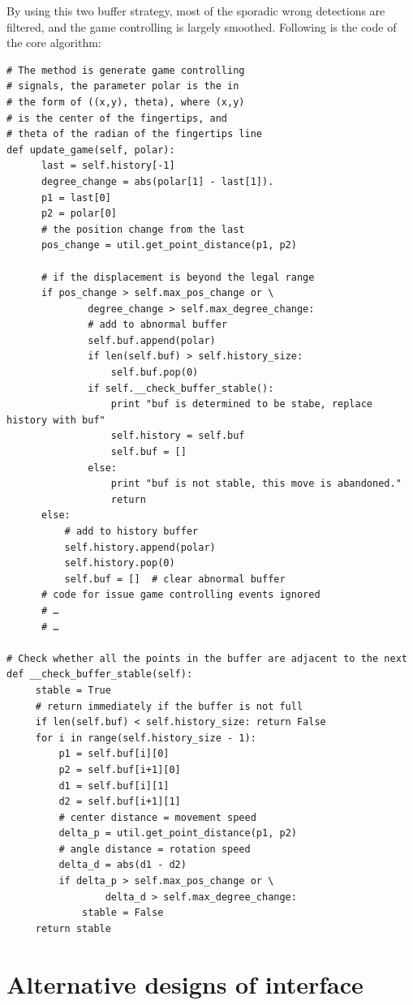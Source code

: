\documentclass[10pt,twocolumn,letterpaper]{article}
\begin{document}
By using this two buffer strategy, most of the sporadic wrong detections are filtered, and the game controlling is largely smoothed. Following is the code of the core algorithm:

{\tiny{
\begin{verbatim}
# The method is generate game controlling 
# signals, the parameter polar is the in 
# the form of ((x,y), theta), where (x,y) 
# is the center of the fingertips, and 
# theta of the radian of the fingertips line
def update_game(self, polar):
      last = self.history[-1]
      degree_change = abs(polar[1] - last[1]).
      p1 = last[0]
      p2 = polar[0]
      # the position change from the last
      pos_change = util.get_point_distance(p1, p2)

      # if the displacement is beyond the legal range
      if pos_change > self.max_pos_change or \
              degree_change > self.max_degree_change: 
              # add to abnormal buffer
              self.buf.append(polar)
              if len(self.buf) > self.history_size:
                  self.buf.pop(0) 
              if self.__check_buffer_stable():
                  print "buf is determined to be stabe, replace history with buf"
                  self.history = self.buf
                  self.buf = []
              else:
                  print "buf is not stable, this move is abandoned."
                  return
      else:
          # add to history buffer
          self.history.append(polar)
          self.history.pop(0)
          self.buf = []  # clear abnormal buffer
      # code for issue game controlling events ignored
      # …
      # …

# Check whether all the points in the buffer are adjacent to the next
def __check_buffer_stable(self):
     stable = True
     # return immediately if the buffer is not full
     if len(self.buf) < self.history_size: return False 
     for i in range(self.history_size - 1):
         p1 = self.buf[i][0]
         p2 = self.buf[i+1][0]
         d1 = self.buf[i][1]
         d2 = self.buf[i+1][1]
         # center distance = movement speed
         delta_p = util.get_point_distance(p1, p2) 
         # angle distance = rotation speed
         delta_d = abs(d1 - d2)   
         if delta_p > self.max_pos_change or \
                 delta_d > self.max_degree_change:
             stable = False
     return stable
\end{verbatim}
}}

\section{Alternative designs of interface}
\end{document}
